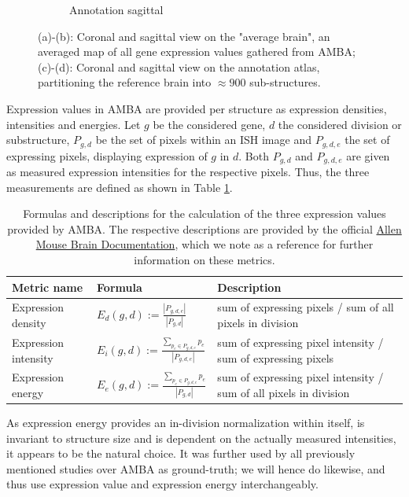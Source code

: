 \documentclass[]{article}
\begin{document}
\begin{figure}
\begin{subfigure}{.3\textwidth}
		\caption{Annotation sagittal}
		\label{fig:ano_sag}
	\end{subfigure}
	\caption{(a)-(b): Coronal and sagittal view on the "average brain", an averaged map of all gene expression values gathered from AMBA; (c)-(d): Coronal and sagittal view on the annotation atlas, partitioning the reference brain into $\approx900$ sub-structures.}
	\label{fig:CCF_images}
\end{figure}

Expression values in AMBA are provided per structure as expression densities, intensities and energies. Let $g$ be the considered gene, $d$ the considered division or substructure, $P_{g,d}$ be the set of pixels within an ISH image and $P_{g,d,e}$ the set of expressing pixels, displaying expression of $g$ in $d$. Both $P_{g,d}$ and $P_{g,d,e}$ are given as measured expression intensities for the respective pixels. Thus, the three measurements are defined as shown in Table \ref{tab:expr_values}.

\begin{table}
	\renewcommand{\arraystretch}{3}
	\begin{tabular}{llp{8cm}}
		Metric name&Formula&Description\\
		\hline
		Expression density&$E_d(g,d):=\frac{|P_{g,d,e}|}{|P_{g,d}|}$&sum of expressing pixels / sum of all pixels in division\\
		Expression intensity&$E_i(g,d):=\frac{\sum_{p_e\in P_{g,d,e}} p_e}{|P_{g,d,e}|}$&sum of expressing pixel intensity / sum of expressing pixels\\
		Expression energy&$E_e(g,d):=\frac{\sum_{p_e\in P_{g,d,e}} p_e}{|P_{g,d}|}$&sum of expressing pixel intensity / sum of all pixels in division\\
	\end{tabular}

	\caption{Formulas and descriptions for the calculation of the three expression values provided by AMBA. The respective descriptions are provided by the official \href{http://help.brain-map.org/download/attachments/2818169/InformaticsDataProcessing.pdf?version=1&modificationDate=1319667590884&api=v2}{Allen Mouse Brain Documentation}, which we note as a reference for further information on these metrics.}
	\label{tab:expr_values}
\end{table}

 As expression energy provides an in-division normalization within itself, is invariant to structure size and is dependent on the actually measured intensities, it appears to be the natural choice. It was further used by all previously mentioned studies over AMBA as ground-truth; we will hence do likewise, and thus use expression value and expression energy interchangeably.
\end{document}
